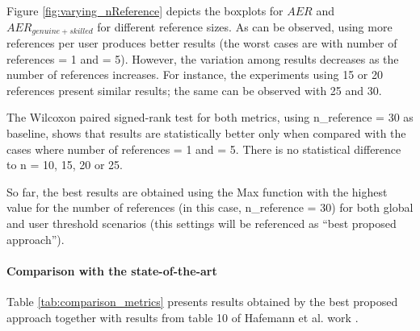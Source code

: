 \documentclass[conference]{IEEEtran}
\begin{document}
Figure \ref{fig:varying_nReference} depicts the boxplots for $AER$ and $AER_{genuine+skilled}$ for different reference sizes. As can be observed, using more references per user produces better results (the worst cases are with number of references = 1 and = 5). However, the variation among results decreases as the number of references increases. For instance, the experiments using 15 or 20 references present similar results; the same can be observed with 25 and 30.
  
The Wilcoxon paired signed-rank test for both metrics, using n\_reference = 30 as baseline, shows that results are statistically better only when compared with the cases where number of references = 1 and = 5. There is no statistical difference to n = 10, 15, 20 or 25.

So far, the best results are obtained using the Max function with the highest value for the number of references (in this case, n\_reference = 30) for both global and user threshold scenarios (this settings will be referenced as ``best proposed approach'').


\paragraph{Comparison with the state-of-the-art}
Table \ref{tab:comparison_metrics} presents results obtained by the best proposed approach together with results from table 10 of Hafemann et al. work \cite{hafemann:17}. 
\end{document}
